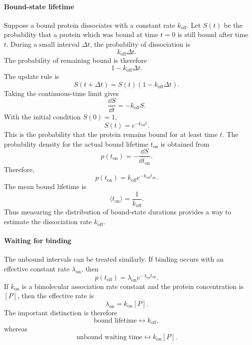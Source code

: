 \paragraph{Bound-state lifetime}
Suppose a bound protein dissociates with a constant rate $k_{\mathrm{off}}$.
Let $S(t)$ be the probability that a protein which was bound at time $t=0$ is still bound after time $t$.
During a small interval $\Delta t$, the probability of dissociation is
% 
\[
    k_{\mathrm{off}}\Delta t.
\]
% 
The probability of remaining bound is therefore
% 
\[
    1-k_{\mathrm{off}}\Delta t.
\]
% 
The update rule is
% 
\[
    S(t+\Delta t)=S(t)\left(1-k_{\mathrm{off}}\Delta t\right).
\]
% 
Taking the continuous-time limit gives
% 
\[
    \frac{\dd S}{\dd t}=-k_{\mathrm{off}}S.
\]
% 
With the initial condition $S(0)=1$,
% 
\[
    \boxed{S(t)=e^{-k_{\mathrm{off}}t}.}
\]
% 
This is the probability that the protein remains bound for at least time $t$.
The probability density for the actual bound lifetime $t_{\mathrm{on}}$ is obtained from
% 
\[
    p(t_{\mathrm{on}})=-\frac{\dd S}{\dd t_{\mathrm{on}}}.
\]
% 
Therefore,
% 
\[
    \boxed{ p(t_{\mathrm{on}})=k_{\mathrm{off}}e^{-k_{\mathrm{off}}t_{\mathrm{on}}}. }
\]
% 
The mean bound lifetime is
% 
\[
    \langle t_{\mathrm{on}}\rangle = \frac{1}{k_{\mathrm{off}}}.
\]
% 
Thus measuring the distribution of bound-state durations provides a way to estimate the dissociation rate $k_{\mathrm{off}}$.
% 
\paragraph{Waiting for binding}
The unbound intervals can be treated similarly.
If binding occurs with an effective constant rate $\lambda_{\mathrm{on}}$, then
% 
\[
    p(t_{\mathrm{off}})=\lambda_{\mathrm{on}}e^{-\lambda_{\mathrm{on}}t_{\mathrm{off}}}.
\]
% 
If $k_{\mathrm{on}}$ is a bimolecular association rate constant and the protein concentration is $[P]$, then the effective rate is
% 
\[
    \lambda_{\mathrm{on}}=k_{\mathrm{on}}[P].
\]
% 
The important distinction is therefore
% 
\[
    \text{bound lifetime} \longleftrightarrow k_{\mathrm{off}},
\]
% 
whereas
% 
\[
    \text{unbound waiting time} \longleftrightarrow k_{\mathrm{on}}[P].
\]




